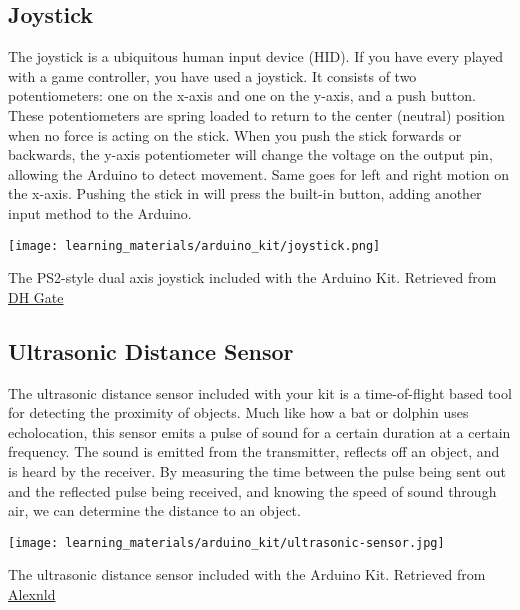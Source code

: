     \subsection*{Joystick}
    The joystick is a ubiquitous human input device (HID).
    If you have every played with a game controller, you have used a joystick.
    It consists of two potentiometers: one on the x-axis and one on the y-axis, and a push button.
    These potentiometers are spring loaded to return to the center (neutral) position when no force is acting on the stick.
    When you push the stick forwards or backwards, the y-axis potentiometer will change the voltage on the output pin, allowing the Arduino to detect movement.
    Same goes for left and right motion on the x-axis.
    Pushing the stick in will press the built-in button, adding another input method to the Arduino.

    \begin{marginfigure}[-2in]
        \texttt{[image: learning\_materials/arduino\_kit/joystick.png]}
        \caption[Joystick]{The PS2-style dual axis joystick included with the Arduino Kit. 
        Retrieved from \href{https://www.orientdisplay.com/wp-content/uploads/2020/08/AMC1602AR-B-B6WTDW-I2C-1.jpg}
        {DH Gate}}
    \end{marginfigure}

    \subsection*{Ultrasonic Distance Sensor}
    The ultrasonic distance sensor included with your kit is a time-of-flight based tool for detecting the proximity of objects.
    Much like how a bat or dolphin uses echolocation, this sensor emits a pulse of sound for a certain duration at a certain frequency.
    The sound is emitted from the transmitter, reflects off an object, and is heard by the receiver.
    By measuring the time between the pulse being sent out and the reflected pulse being received, and knowing the speed of sound through air, we can determine the distance to an object.
    
    \begin{marginfigure}[-1.5in]
        \texttt{[image: learning\_materials/arduino\_kit/ultrasonic-sensor.jpg]}
        \caption[Ultrasonic Sensor]{The ultrasonic distance sensor included with the Arduino Kit. 
        Retrieved from \href{https://alexnld.com/wp-content/uploads/2017/12/DIY4002_1.jpg}
        {Alexnld}}
    \end{marginfigure}

